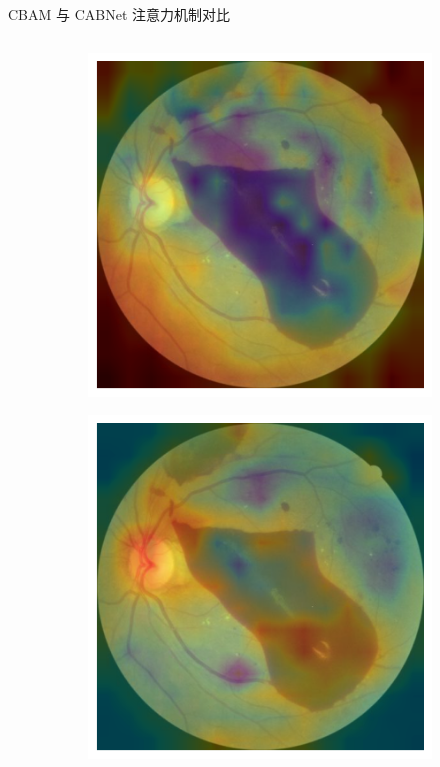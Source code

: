\documentclass[9pt, aspectratio=1610]{beamer}
\begin{document}
\begin{frame}{CBAM 与 CABNet 注意力机制对比}
\begin{columns}
\begin{column}{0.6\textwidth}
\begin{figure}[H]
\begin{subfigure}[b]{0.2\textwidth}
                    \includegraphics[width=\textwidth]{cbam-heatmap-1.png}
                \end{subfigure}
                \hspace{2mm}
                \begin{subfigure}[b]{0.2\textwidth}
                    \raggedright
                    \includegraphics[width=\textwidth]{cabnet-heatmap-1.png}

\end{subfigure}
\end{figure}
\end{column}
\end{columns}
\end{frame}
\end{document}
